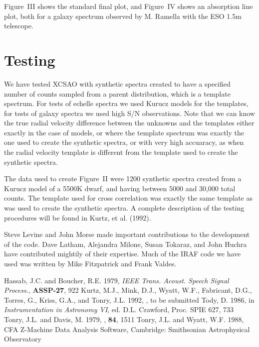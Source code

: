 Figure~III shows the standard final plot, and Figure~IV shows an absorption line
plot, both for a galaxy spectrum observed by M. Ramella with the ESO 1.5m
telescope.

\section{Testing}

We have tested XCSAO with synthetic spectra created to have a specified number
of counts sampled from a parent distribution, which is a template spectrum. 
For tests of echelle spectra we used Kurucz models for the templates, for tests
of galaxy spectra we used high S/N observations.  Note that we can know the
true radial velocity difference between the unknowns and the templates either
exactly in the case of models, or where the template spectrum was exactly the
one used to create the synthetic spectra, or with very high accuaracy, as when
the radial velocity template is different from the template used to create the
synthetic spectra.
             
The data used to create Figure~II were 1200 synthetic spectra created from a
Kurucz model of a 5500K dwarf, and having between 5000 and 30,000 total counts. 
The template used for cross correlation was exactly the same template as was
used to create the synthetic spectra.  A complete description of the testing 
procedures will be found in Kurtz, et al. (1992).  

\acknowledgments

Steve Levine and John Morse made important contributions to the development of
the code.  Dave Latham, Alejandra Milone, Susan Tokaraz, and John Huchra have
contributed mightily of their expertise.  Much of the IRAF code we have used
was written by Mike Fitzpatrick and Frank Valdes.

\begin{references}
 Hassab, J.C. and Boucher, R.E. 1979, {\it IEEE Trans. Acoust. Speech
Signal Process.}, {\bf ASSP-27}, 922
 Kurtz, M.J., Mink, D.J., Wyatt, W.F., Fabricant, D.G., Torres, G.,
Kriss, G.A., and Tonry, J.L. 1992, \pasp, to be submitted
 Tody, D. 1986, in {\it Instrumentation in Astronomy VI}, ed. D.L.
Crawford, Proc. SPIE 627, 733
 Tonry, J.L. and Davis, M. 1979, \aj, {\bf 84}, 1511
 Tonry, J.L. and Wyatt, W.F. 1988, {CFA Z-Machine Data Analysis
Software}, Cambridge: Smithsonian Astrophysical Observatory
\end{references}



